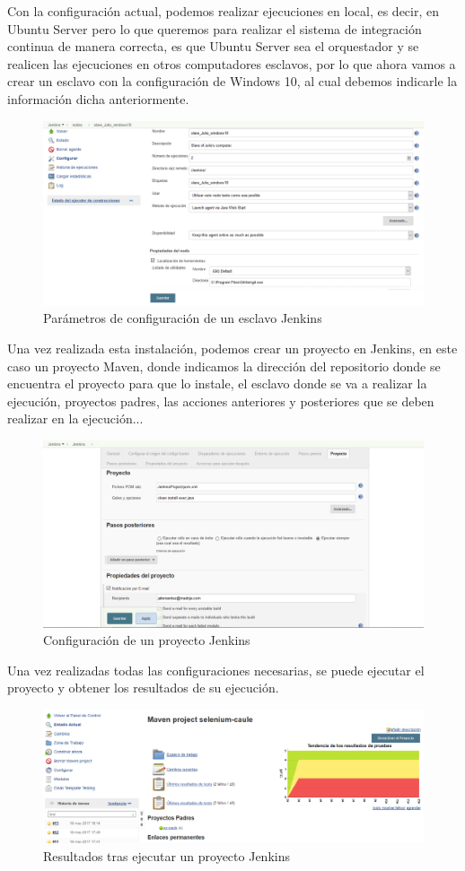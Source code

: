 \clearpage

Con la configuración actual, podemos realizar ejecuciones en local, es decir, en Ubuntu Server pero lo que queremos para realizar el sistema de integración continua de manera correcta, es que Ubuntu Server sea el orquestador y se realicen las ejecuciones en otros computadores esclavos, por lo que ahora vamos a crear un esclavo con la configuración de Windows 10, al cual debemos indicarle la información dicha anteriormente.

\begin{figure}[!h]
\centering
   \includegraphics[width=12cm]{ParametroEsclavo.PNG}
\caption{Parámetros de configuración de un esclavo Jenkins}
\end{figure}

Una vez realizada esta instalación, podemos crear un proyecto en Jenkins, en este caso un proyecto Maven, donde indicamos la dirección del repositorio donde se encuentra el proyecto para que lo instale, el esclavo donde se va a realizar la ejecución, proyectos padres, las acciones anteriores y posteriores que se deben realizar en la ejecución...

\begin{figure}[!h]
\centering
   \includegraphics[width=12cm]{ParametroProyectoJenkins.PNG}
\caption{Configuración de un proyecto Jenkins}
\end{figure}

\clearpage

Una vez realizadas todas las configuraciones necesarias, se puede ejecutar el proyecto y obtener los resultados de su ejecución.

\begin{figure}[!h]
\centering
   \includegraphics[width=14cm]{ResultadosJenkins.PNG}
\caption{Resultados tras ejecutar un proyecto Jenkins}
\end{figure}

